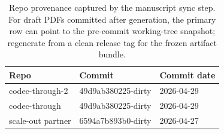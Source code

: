 \begin{table}[H]
\centering
\caption{Repo provenance captured by the manuscript sync step. For draft PDFs committed after generation, the primary row can point to the pre-commit working-tree snapshot; regenerate from a clean release tag for the frozen artifact bundle.}
\label{tab:repo-provenance}
\begin{tabular}{lll}
\toprule
Repo & Commit & Commit date \\
\midrule
codec-through-2 & 49d9ab380225-dirty & 2026-04-29 \\
codec-through & 49d9ab380225-dirty & 2026-04-29 \\
scale-out partner & 6594a7b893b0-dirty & 2026-04-27 \\
\bottomrule
\end{tabular}
\end{table}
